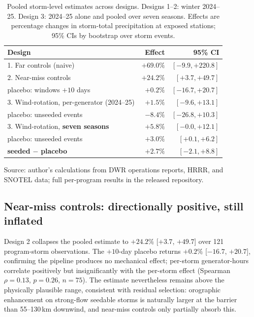 \documentclass[9pt,twocolumn,twoside]{article}
\begin{document}
\begin{table}[t]
\caption{Pooled storm-level estimates across designs. Designs 1--2: winter
2024--25. Design 3: 2024--25 alone and pooled over seven seasons.
Effects are percentage changes in storm-total precipitation at exposed
stations; 95\% CIs by bootstrap over storm events.}
\label{tab:designs}
\small
\begin{tabular}{@{}lrr@{}}
\toprule
Design & Effect & 95\% CI \\
\midrule
1. Far controls (naive) & $+69.0\%$ & $[-9.9, +220.8]$ \\
2. Near-miss controls & $+24.2\%$ & $[+3.7, +49.7]$ \\
\quad placebo: windows $+10$ days & $+0.2\%$ & $[-16.7, +20.7]$ \\
3. Wind-rotation, per-generator (2024--25) & $+1.5\%$ & $[-9.6, +13.1]$ \\
\quad placebo: unseeded events & $-8.4\%$ & $[-26.8, +10.3]$ \\
3. Wind-rotation, \textbf{seven seasons} & $+5.8\%$ & $[-0.0, +12.1]$ \\
\quad placebo: unseeded events & $+3.0\%$ & $[+0.1, +6.2]$ \\
\quad \textbf{seeded $-$ placebo} & $\mathbf{+2.7\%}$ & $\mathbf{[-2.1, +8.8]}$ \\
\bottomrule
\end{tabular}

\medskip
\footnotesize Source: author's calculations from DWR operations reports,
HRRR, and SNOTEL data; full per-program results in the released repository.
\end{table}

\subsection{Near-miss controls: directionally positive, still inflated}
Design 2 collapses the pooled estimate to $+24.2\%$ [$+3.7$, $+49.7$] over
121 program-storm observations. The $+10$-day placebo returns $+0.2\%$
[$-16.7$, $+20.7$], confirming the pipeline produces no mechanical effect;
per-storm generator-hours correlate positively but insignificantly with the
per-storm effect (Spearman $\rho = 0.13$, $p = 0.26$, $n=75$). The estimate
nevertheless remains above the physically plausible range, consistent with
residual selection: orographic enhancement on strong-flow seedable storms is
naturally larger at the barrier than 55--130\,km downwind, and near-miss
controls only partially absorb this.
\end{document}

